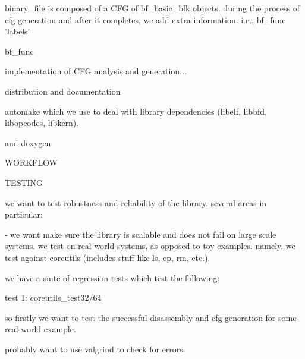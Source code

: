 binary\_file is composed of a CFG of bf\_basic\_blk objects. during the process of cfg generation and after it completes, we add extra information. i.e., bf\_func 'labels'

bf\_func

implementation of CFG analysis and generation...

distribution and documentation

automake which we use to deal with library dependencies (libelf, libbfd, libopcodes, libkern).

 and doxygen

WORKFLOW



TESTING

we want to test robustness and reliability of the library. several areas in particular:

- we want make sure the library is scalable and does not fail on large scale systems. we test on real-world systems, as opposed to toy examples. namely, we test against coreutils (includes stuff like ls, cp, rm, etc.).

we have a suite of regression tests which test the following:

test 1: coreutils\_test32/64

so firstly we want to test the successful disassembly and cfg generation for some real-world example. 

probably want to use valgrind to check for errors